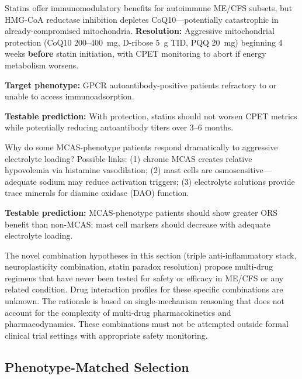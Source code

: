 \begin{hypothesis}
\label{hyp:statin-paradox}
Statins offer immunomodulatory benefits for autoimmune ME/CFS subsets, but HMG-CoA reductase inhibition depletes CoQ10---potentially catastrophic in already-compromised mitochondria. \textbf{Resolution:} Aggressive mitochondrial protection (CoQ10 200--400~mg, D-ribose 5~g TID, PQQ 20~mg) beginning 4 weeks \textbf{before} statin initiation, with CPET monitoring to abort if energy metabolism worsens.

\textbf{Target phenotype:} GPCR autoantibody-positive patients refractory to or unable to access immunoadsorption.

\textbf{Testable prediction:} With protection, statins should not worsen CPET metrics while potentially reducing autoantibody titers over 3--6 months.
\end{hypothesis}

\begin{speculation}
\label{spec:electrolyte-mcas}
Why do some MCAS-phenotype patients respond dramatically to aggressive electrolyte loading? Possible links: (1) chronic MCAS creates relative hypovolemia via histamine vasodilation; (2) mast cells are osmosensitive---adequate sodium may reduce activation triggers; (3) electrolyte solutions provide trace minerals for diamine oxidase (DAO) function.

\textbf{Testable prediction:} MCAS-phenotype patients should show greater ORS benefit than non-MCAS; mast cell markers should decrease with adequate electrolyte loading.
\end{speculation}

\begin{limitation}
The novel combination hypotheses in this section (triple anti-inflammatory stack, neuroplasticity combination, statin paradox resolution) propose multi-drug regimens that have never been tested for safety or efficacy in ME/CFS or any related condition. Drug interaction profiles for these specific combinations are unknown. The rationale is based on single-mechanism reasoning that does not account for the complexity of multi-drug pharmacokinetics and pharmacodynamics. These combinations must not be attempted outside formal clinical trial settings with appropriate safety monitoring.
\end{limitation}

\subsection{Phenotype-Matched Selection}


